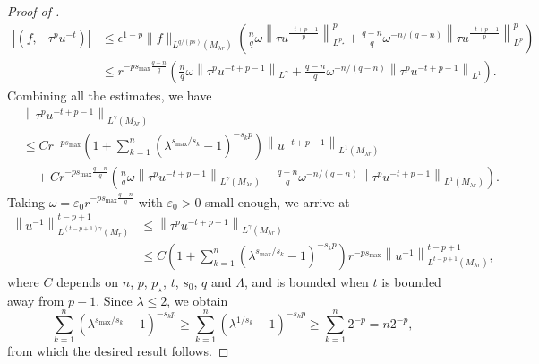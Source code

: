 \documentclass[11pt]{amsart}
\theoremstyle{plain}
\theoremstyle{definition}
\numberwithin{equation}{section}
\begin{document}
\begin{proof} [Proof of ]
\begin{equation*}
\begin{split}
|(f, -\tau^p u^{-t})|
&\leq \epsilon^{1-p} \|f\|_{L^{q/(p\bar{s})}(M_{\lambda r})} \left( \frac{n}{q} \omega \left\| \tau u^{\frac{-t+p-1}{p}} \right\|_{L^{p_\star}}^p + \frac{q-n}{q} \omega^{-n/(q-n)} \left\|\tau u^{\frac{-t+p-1}{p}} \right\|_{L^p}^p \right) \\
&\leq r^{-ps_{\max}\frac{q-n}{q}} \left( \frac{n}{q} \omega \left\| \tau^p u^{-t+p-1} \right\|_{L^{\gamma}} + \frac{q-n}{q} \omega^{-n/(q-n)} \left\|\tau^p u^{-t+p-1} \right\|_{L^1} \right).
\end{split}
\end{equation*}
Combining all the estimates, we have
\begin{equation*}
\begin{split}
&\left\|\tau^p u^{-t+p-1} \right\|_{L^{\gamma}(M_{\lambda r})} \\
&\leq C r^{-ps_{\max}}\left( 1+\sum_{k=1}^n \left( \lambda^{s_{\max}/s_k}-1 \right)^{-s_k p} \right) \left\|u^{-t+p-1}\right\|_{L^1(M_{\lambda r})} \\
&\quad +Cr^{-ps_{\max}\frac{q-n}{q}} \left( \frac{n}{q} \omega \left\| \tau^p u^{-t+p-1} \right\|_{L^{\gamma}(M_{\lambda r})} + \frac{q-n}{q} \omega^{-n/(q-n)} \left\|\tau^p u^{-t+p-1} \right\|_{L^1(M_{\lambda r})} \right).
\end{split}
\end{equation*}
Taking $\omega = \varepsilon_0 r^{-ps_{\max}\frac{q-n}{q}}$ with $\varepsilon_0 > 0$ small enough, we arrive at
\begin{equation*}
\begin{split}
\left\| u^{-1} \right\|_{L^{(t-p+1)\gamma}(M_r)}^{t-p+1}
&\leq \left\|\tau^p u^{-t+p-1} \right\|_{L^{\gamma}(M_{\lambda r})} \\
&\leq C\left( 1+\sum_{k=1}^n \left( \lambda^{s_{\max}/s_k}-1 \right)^{-s_k p} \right) r^{-ps_{\max}} \left\|u^{-1}\right\|_{L^{t-p+1}(M_{\lambda r})}^{t-p+1},
\end{split}
\end{equation*}
where $C$ depends on $n$, $p$, $p_{\star}$, $t$, $s_0$, $q$ and $\Lambda$, and is bounded when $t$ is bounded away from $p-1$. Since $\lambda \leq 2$, we obtain
\begin{equation*}
\sum_{k=1}^n \left( \lambda^{s_{\max}/s_k}-1 \right)^{-s_k p} \geq \sum_{k=1}^n \left( \lambda^{1/s_k}-1 \right)^{-s_k p} \geq \sum_{k=1}^n 2^{-p} = n2^{-p},
\end{equation*}
from which the desired result follows.
\end{proof}
\end{document}
